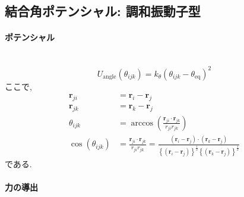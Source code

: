\subsection{結合角ポテンシャル: 調和振動子型}
\paragraph{ポテンシャル} \
\begin{equation}
    U_{\mathrm{angle}}(\theta_{ijk})
  =
    k_{\theta} (\theta_{ijk} - \theta_{\mathrm{eq}})^{2}
\end{equation}
ここで, 
\begin{align}
    \bm{r}_{ji}
 &= \bm{r}_{i} - \bm{r}_{j}
 \\
    \bm{r}_{jk}
 &= \bm{r}_{k} - \bm{r}_{j}
 \\
    \theta_{ijk}
 &= \arccos \left( \frac{\bm{r}_{ji} \cdot \bm{r}_{jk}}{r_{ji} r_{jk}} \right)
 \\
    \cos(\theta_{ijk})
 &= \frac{\bm{r}_{ji} \cdot \bm{r}_{jk}}{r_{ji} r_{jk}}
  = \frac{(\bm{r}_{i} - \bm{r}_{j}) \cdot (\bm{r}_{k} - \bm{r}_{j})}
         {\left\{(\bm{r}_{i} - \bm{r}_{j})\right\}^{\frac{1}{2}}
          \left\{(\bm{r}_{k} - \bm{r}_{j})\right\}^{\frac{1}{2}}}
\end{align}
である.

\paragraph{力の導出} \


